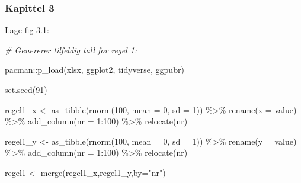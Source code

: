\documentclass[
]{book}
\newenvironment{Shaded}{\begin{snugshade}}{\end{snugshade}}
\newcommand{\AttributeTok}[1]{\textcolor[rgb]{0.77,0.63,0.00}{#1}}
\newcommand{\CommentTok}[1]{\textcolor[rgb]{0.56,0.35,0.01}{\textit{#1}}}
\newcommand{\DecValTok}[1]{\textcolor[rgb]{0.00,0.00,0.81}{#1}}
\newcommand{\FunctionTok}[1]{\textcolor[rgb]{0.00,0.00,0.00}{#1}}
\newcommand{\NormalTok}[1]{#1}
\newcommand{\OtherTok}[1]{\textcolor[rgb]{0.56,0.35,0.01}{#1}}
\newcommand{\SpecialCharTok}[1]{\textcolor[rgb]{0.00,0.00,0.00}{#1}}
\newcommand{\StringTok}[1]{\textcolor[rgb]{0.31,0.60,0.02}{#1}}
\begin{document}
\hypertarget{kapittel-3}{%
\subsubsection*{Kapittel 3}\label{kapittel-3}}

Lage fig 3.1:

\begin{Shaded}
\begin{Highlighting}[]
\CommentTok{\# Genererer tilfeldig tall for regel 1:}

\NormalTok{pacman}\SpecialCharTok{::}\FunctionTok{p\_load}\NormalTok{(xlsx, ggplot2, tidyverse, ggpubr)}

\FunctionTok{set.seed}\NormalTok{(}\DecValTok{91}\NormalTok{)}

\NormalTok{regel1\_x }\OtherTok{\textless{}{-}} \FunctionTok{as\_tibble}\NormalTok{(}\FunctionTok{rnorm}\NormalTok{(}\DecValTok{100}\NormalTok{, }\AttributeTok{mean =} \DecValTok{0}\NormalTok{, }\AttributeTok{sd =} \DecValTok{1}\NormalTok{)) }\SpecialCharTok{\%\textgreater{}\%}
  \FunctionTok{rename}\NormalTok{(}\AttributeTok{x =}\NormalTok{ value) }\SpecialCharTok{\%\textgreater{}\%}
  \FunctionTok{add\_column}\NormalTok{(}\AttributeTok{nr =} \DecValTok{1}\SpecialCharTok{:}\DecValTok{100}\NormalTok{) }\SpecialCharTok{\%\textgreater{}\%}
  \FunctionTok{relocate}\NormalTok{(nr)}

\NormalTok{regel1\_y }\OtherTok{\textless{}{-}} \FunctionTok{as\_tibble}\NormalTok{(}\FunctionTok{rnorm}\NormalTok{(}\DecValTok{100}\NormalTok{, }\AttributeTok{mean =} \DecValTok{0}\NormalTok{, }\AttributeTok{sd =} \DecValTok{1}\NormalTok{)) }\SpecialCharTok{\%\textgreater{}\%}
  \FunctionTok{rename}\NormalTok{(}\AttributeTok{y =}\NormalTok{ value) }\SpecialCharTok{\%\textgreater{}\%}
  \FunctionTok{add\_column}\NormalTok{(}\AttributeTok{nr =} \DecValTok{1}\SpecialCharTok{:}\DecValTok{100}\NormalTok{) }\SpecialCharTok{\%\textgreater{}\%}
  \FunctionTok{relocate}\NormalTok{(nr)}

\NormalTok{regel1 }\OtherTok{\textless{}{-}} \FunctionTok{merge}\NormalTok{(regel1\_x,regel1\_y,}\AttributeTok{by=}\StringTok{"nr"}\NormalTok{)}


\end{Highlighting}
\end{Shaded}
\end{document}
